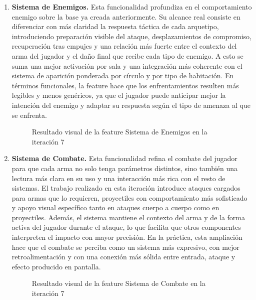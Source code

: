\begin{enumerate}
\item \textbf{Sistema de Enemigos.} Esta funcionalidad profundiza en el comportamiento
enemigo sobre la base ya creada anteriormente. Su alcance real consiste en diferenciar con
más claridad la respuesta táctica de cada arquetipo, introduciendo preparación visible del
ataque, desplazamientos de compromiso, recuperación tras empujes y una relación más fuerte
entre el contexto del arma del jugador y el daño final que recibe cada tipo de enemigo. A
esto se suma una mejor activación por sala y una integración más coherente con el sistema de
aparición ponderada por círculo y por tipo de habitación. En términos funcionales, la
feature hace que los enfrentamientos resulten más legibles y menos genéricos, ya que el
jugador puede anticipar mejor la intención del enemigo y adaptar su respuesta según el tipo
de amenaza al que se enfrenta.

\begin{figure}[H]
\begin{center}
\caption{Resultado visual de la feature Sistema de Enemigos en la iteración 7}
\label{fig:iteracion7-feature-enemigos}
\end{center}
\end{figure}

\item \textbf{Sistema de Combate.} Esta funcionalidad refina el combate del jugador para que
cada arma no solo tenga parámetros distintos, sino también una lectura más clara en su uso y
una interacción más rica con el resto de sistemas. El trabajo realizado en esta iteración
introduce ataques cargados para armas que lo requieren, proyectiles con comportamiento más
sofisticado y apoyo visual específico tanto en ataques cuerpo a cuerpo como en proyectiles.
Además, el sistema mantiene el contexto del arma y de la forma activa del jugador durante el
ataque, lo que facilita que otros componentes interpreten el impacto con mayor precisión. En
la práctica, esta ampliación hace que el combate se perciba como un sistema más expresivo,
con mejor retroalimentación y con una conexión más sólida entre entrada, ataque y efecto
producido en pantalla.

\begin{figure}[H]
\begin{center}
\caption{Resultado visual de la feature Sistema de Combate en la iteración 7}
\label{fig:iteracion7-feature-combate}
\end{center}
\end{figure}


\end{enumerate}
